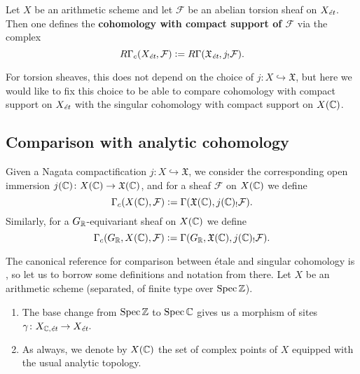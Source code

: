 \documentclass{article}
\numberwithin{equation}{section}
\begin{document}
\begin{appendices}
\begin{definition}
  Let $X$ be an arithmetic scheme and let $\mathcal{F}$ be an abelian torsion
  sheaf on $X_\et$. Then one defines the
  \textbf{cohomology with compact support of $\mathcal{F}$} via the complex
  \begin{equation}
    \label{eqn:RGammac-via-extension-by-zero}
    R\Gamma_c (X_\et, \mathcal{F}) \dfn
    R\Gamma (\mathfrak{X}_\text{\it \'et}, j_! \mathcal{F}).
  \end{equation}
\end{definition}

For torsion sheaves, this does not depend on the choice of
$j\colon X \hookrightarrow \mathfrak{X}$, but here we would like to fix this
choice to be able to compare cohomology with compact support on $X_\et$ with
the singular cohomology with compact support on $X (\CC)$.

\subsection*{Comparison with analytic cohomology}

\begin{definition}
  Given a Nagata compactification $j\colon X\hookrightarrow \mathfrak{X}$,
  we consider the corresponding open immersion
  $j (\CC)\colon X (\CC) \to \mathfrak{X} (\CC)$,
  and for a sheaf $\mathcal{F}$ on $X (\CC)$ we define
  \[ \Gamma_c (X (\CC), \mathcal{F}) \dfn
  \Gamma (\mathfrak{X} (\CC), j (\CC)_! \mathcal{F}). \]
  Similarly, for a $G_\RR$-equivariant sheaf on $X (\CC)$ we define
  \[ \Gamma_c (G_\RR, X (\CC), \mathcal{F}) \dfn
  \Gamma (G_\RR, \mathfrak{X} (\CC), j (\CC)_! \mathcal{F}). \]
\end{definition}

The canonical reference for comparison between étale and singular cohomology is
\cite[Exposé~XI, \S 4]{SGA4}, so let us to borrow some definitions and notation
from there. Let $X$ be an arithmetic scheme (separated, of finite type over
$\Spec \ZZ$).

\begin{enumerate}
\item The base change from $\Spec \ZZ$ to $\Spec \CC$ gives us a morphism of
  sites
  $\gamma\colon X_{\CC,\text{\it ét}} \to X_\et$.

\item As always, we denote by $X (\CC)$ the set of complex points of $X$
  equipped with the usual analytic topology.


\end{enumerate}
\end{appendices}
\end{document}
